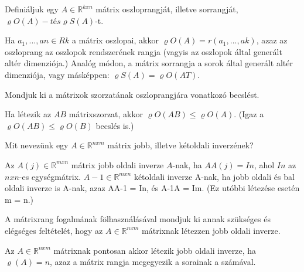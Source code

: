 \begin{frame}
  \begin{tcolorbox}[title={14}]
    Definiáljuk egy $A \in \mathbb{R}^{k x n}$ mátrix oszloprangját, illetve sorrangját, ${\varrho}O(A)-t és {\varrho}S(A)$-t.

  \tcblower
Ha $a_1,...,an \in Rk$ a mátrix oszlopai, akkor ${\varrho}O(A) = r(a_1,...,ak)$, azaz az oszloprang az oszlopok rendszerének rangja (vagyis az oszlopok által generált altér dimenziója.) Analóg módon, a mátrix sorrangja a sorok által generált altér dimenziója, vagy másképpen: ${\varrho}S(A) = {\varrho}O(AT)$.

  \end{tcolorbox}
\end{frame}

\begin{frame}
  \begin{tcolorbox}[title={15}]
   Mondjuk ki a mátrixok szorzatának oszloprangjára vonatkozó becslést.


  \tcblower
Ha létezik az $AB$ mátrixszorzat, akkor ${\varrho}O(AB) \leq {\varrho}O(A)$. (Igaz a ${\varrho}O(AB) \leq {\varrho}O(B)$ becslés is.)

  \end{tcolorbox}
\end{frame}


\begin{frame}
  \begin{tcolorbox}[title={16}]
     Mit nevezünk egy $A \in \mathbb{R}^{n x m}$ mátrix jobb, illetve kétoldali inverzének?

  \tcblower
Az $A(j) \in \mathbb{R}^{m x n}$ mátrix jobb oldali inverze $A$-nak, ha $AA(j) = In$, ahol $In$ az $n x n$-es egységmátrix. $A-1 \in \mathbb{R}^{m x n}$ kétoldali inverze A-nak, ha jobb oldali és bal oldali inverze is A-nak, azaz AA-1 = In, és A-1A = Im. (Ez utóbbi létezése esetén m = n.)

  \end{tcolorbox}
\end{frame}


\begin{frame}
  \begin{tcolorbox}[title={17}]
    A mátrixrang fogalmának fölhasználásával mondjuk ki annak szükséges és elégséges feltételét, hogy az $A \in \mathbb{R}^{n x m}$ mátrixnak létezzen jobb oldali inverze.

  \tcblower
Az $A \in \mathbb{R}^{n x m}$ mátrixnak pontosan akkor létezik jobb oldali inverze, ha ${\varrho}(A) = n$, azaz a mátrix rangja megegyezik a sorainak a számával.

  \end{tcolorbox}
\end{frame}


